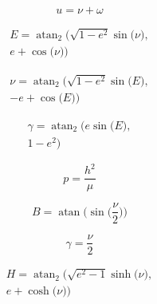 \documentclass[10pt]{article}
\begin{document}
\begin{minipage}[t]{0.2487\textwidth}
\[u = \nu + \omega\]
\end{minipage}%
\begin{minipage}[t]{0.2487\textwidth}
\[\begin{aligned}E = \operatorname{atan}_{2}\bigl(\sqrt{1 - e^{2}} \sin\bigl(\nu \bigr), \\ e + \cos\bigl(\nu \bigr) \bigr)\end{aligned}\]
\end{minipage}
\par\smallskip
\noindent\begin{minipage}[t]{0.2487\textwidth}
\[\begin{aligned}\nu = \operatorname{atan}_{2}\bigl(\sqrt{1 - e^{2}} \sin\bigl(E \bigr), \\ - e + \cos\bigl(E \bigr) \bigr)\end{aligned}\]
\end{minipage}%
\begin{minipage}[t]{0.2487\textwidth}
\[\begin{aligned}\gamma = \operatorname{atan}_{2}\bigl(e \sin\bigl(E \bigr), \\ 1 - e^{2} \bigr)\end{aligned}\]
\end{minipage}%
\begin{minipage}[t]{0.2487\textwidth}
\[p = \frac{h^{2}}{\mu}\]
\end{minipage}%
\begin{minipage}[t]{0.2487\textwidth}
\[B = \operatorname{atan}\bigl(\sin\bigl(\frac{\nu}{2} \bigr) \bigr)\]
\end{minipage}
\par\smallskip
\noindent\begin{minipage}[t]{0.2487\textwidth}
\[\gamma = \frac{\nu}{2}\]
\end{minipage}%
\begin{minipage}[t]{0.2487\textwidth}
\[\begin{aligned}H = \operatorname{atan}_{2}\bigl(\sqrt{e^{2} - 1} \sinh\bigl(\nu \bigr), \\ e + \cosh\bigl(\nu \bigr) \bigr)\end{aligned}\]
\end{minipage}%
\end{document}
